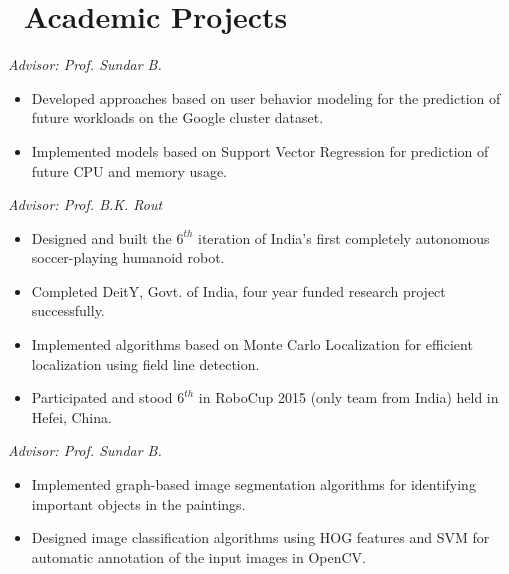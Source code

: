 \documentclass{resume}
\begin{document}
\section{\faCodeFork\ Academic Projects}
\textit{Advisor: Prof. Sundar B.} \hfill
\begin{itemize}
  \item Developed approaches based on user behavior modeling for the prediction of future workloads on the Google cluster dataset.
  \item Implemented models based on Support Vector Regression for prediction of future CPU and memory usage.
\end{itemize}

\textit{Advisor: Prof. B.K. Rout} \hfill
\begin{itemize}
	\item Designed and built the $6^{th}$ iteration of India's first completely autonomous soccer-playing humanoid robot.
	\item Completed DeitY, Govt. of India, four year funded research project successfully.
	\item Implemented algorithms based on Monte Carlo Localization for efficient localization using field line detection.
	\item Participated and stood $6^{th}$ in RoboCup 2015 (only team from India) held in Hefei, China.
\end{itemize}

\textit{Advisor: Prof. Sundar B.} \hfill
\begin{itemize}
	\item Implemented graph-based image segmentation algorithms for identifying important objects in the paintings.
	\item Designed image classification algorithms using HOG features and SVM for automatic annotation of the input images in OpenCV.
\end{itemize}

\end{document}
